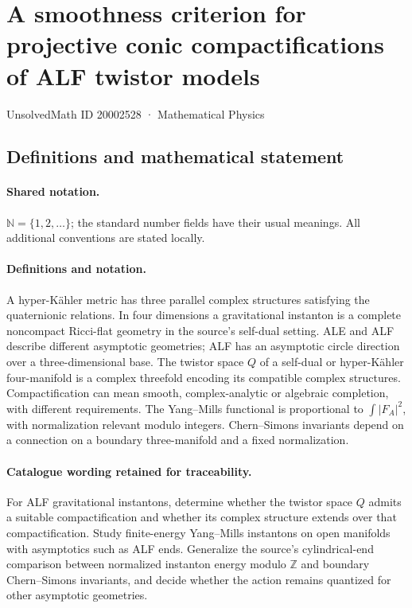 \documentclass[11pt]{article}
\begin{document}
\setcounter{section}{20002527}
\section{A smoothness criterion for projective conic compactifications of ALF twistor models}\label{20002528}
{\small UnsolvedMath ID 20002528 · Mathematical Physics}
\subsection{Definitions and mathematical statement}

\paragraph{Shared notation.}$\mathbb N=\{1,2,\ldots\}$; the standard number fields have their usual meanings. All additional conventions are stated locally.


\paragraph{Definitions and notation.}A hyper-Kähler metric has three parallel complex structures satisfying the quaternionic relations. In four dimensions a gravitational instanton is a complete noncompact Ricci-flat geometry in the source’s self-dual setting. ALE and ALF describe different asymptotic geometries; ALF has an asymptotic circle direction over a three-dimensional base. The twistor space $Q$ of a self-dual or hyper-Kähler four-manifold is a complex threefold encoding its compatible complex structures. Compactification can mean smooth, complex-analytic or algebraic completion, with different requirements. The Yang--Mills functional is proportional to $\int|F_A|^2$, with normalization relevant modulo integers. Chern--Simons invariants depend on a connection on a boundary three-manifold and a fixed normalization.

\paragraph{Catalogue wording retained for traceability.}
For ALF gravitational instantons, determine whether the twistor space $Q$ admits a suitable compactification and whether its complex structure extends over that compactification. Study finite-energy Yang--Mills instantons on open manifolds with asymptotics such as ALF ends. Generalize the source’s cylindrical-end comparison between normalized instanton energy modulo $\mathbb Z$ and boundary Chern--Simons invariants, and decide whether the action remains quantized for other asymptotic geometries.
\end{document}
